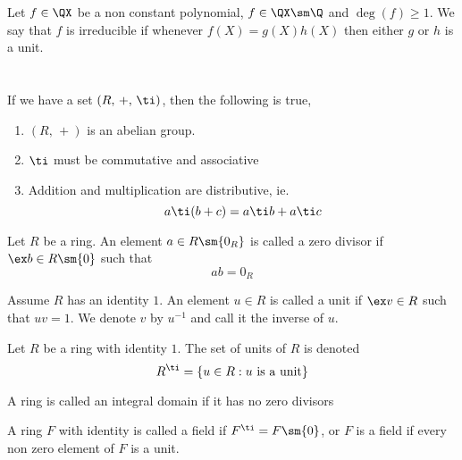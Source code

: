 \documentclass{article}
\begin{document}
\begin{ndefi}[Irriducible]
  Let $f \in\QX$ be a non constant polynomial, $f \in \QX\sm\Q$ and $\deg(f) \ge 1$. We say that $f$ is irreducible if whenever $f(X) = g(X)h(X)$ then either $g$ or $h$ is a unit.
\end{ndefi}

\section[Rings and Fields]{}

\begin{ndefi}
  If we have a set $(R,\,+,\,\ti)$, then the following is true,
  \begin{enumerate}
    \item $(R,\,+)$ is an abelian group.
    \item $\ti$ must be commutative and associative
    \item Addition and multiplication are distributive, ie.
    $$ a \ti (b + c) = a \ti b + a \ti c $$
  \end{enumerate}
\end{ndefi}

\begin{ndefi}
  Let $R$ be a ring. An element $a \in R \sm \{0_R\}$ is called a zero divisor if $\ex b \in R \sm \{0\}$ such that
  $$ ab = 0_R $$
\end{ndefi}

\begin{ndefi}[Unit]
  Assume $R$ has an identity $1$. An element $u \in R$ is called a unit if $\ex v \in R$ such that $uv = 1$. We denote $v$ by $u^{-1}$ and call it the inverse of $u$.
\end{ndefi}

\begin{ndefi}
  Let $R$ be a ring with identity $1$. The set of units of $R$ is denoted
  $$ R^\ti = \{u \in R : u \text{ is a unit}\} $$
\end{ndefi}

\begin{ndefi}
  A ring is called an integral domain if it has no zero divisors
\end{ndefi}

\begin{ndefi}[Field]
  A ring $F$ with identity is called a field if $F^\ti = F \sm \{0\}$, or $F$ is a field if every non zero element of $F$ is a unit.
\end{ndefi}
\end{document}
